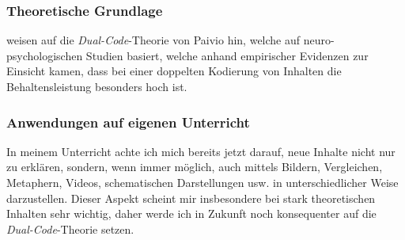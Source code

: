\begin{myExBox}[title=\textit{Dual-Code}-Theorie \& Multi-Modalität im Unterricht]
\subsubsection*{Theoretische Grundlage}
\textcite{alma99116838938605511} weisen auf die \textit{Dual-Code}-Theorie von Paivio hin, welche auf neuro-psychologischen Studien basiert, welche anhand empirischer Evidenzen zur Einsicht kamen, dass bei einer doppelten Kodierung von Inhalten die Behaltensleistung besonders hoch ist.
\subsubsection*{Anwendungen auf eigenen Unterricht}
In meinem Unterricht achte ich mich bereits jetzt darauf, neue Inhalte nicht nur zu erklären, sondern, wenn immer möglich, auch mittels Bildern, Vergleichen, Metaphern, Videos, schematischen Darstellungen usw. in unterschiedlicher Weise darzustellen. Dieser Aspekt scheint mir insbesondere bei stark theoretischen Inhalten sehr wichtig, daher werde ich in Zukunft noch konsequenter auf die \textit{Dual-Code}-Theorie setzen.
\end{myExBox}
